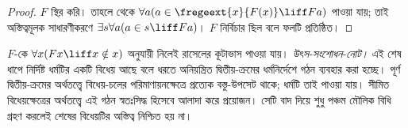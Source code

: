 \documentclass[../../../include/open-logic-section]{subfiles}
\begin{document}
\begin{proof}
$F$ স্থির করি। তাহলে  থেকে
$\forall a (a \in \fregeext{x}{F(x)} \liff Fa)$ পাওয়া যায়;
তাই অস্তিত্বমূলক সাধারণীকরণে
$\exists s\forall a(a \in s \liff Fa)$। $F$ নির্বিচার
ছিল বলে ফলটি প্রতিষ্ঠিত।
\end{proof}

$F$-কে $\forall x(Fx \liff x \notin x)$ অনুযায়ী নিলেই
রাসেলের কূটাভাস পাওয়া যায়।
\emph{উৎস-সংশোধন-নোট।} এই শেষ ধাপে নির্দিষ্ট ধর্মটির একটি
বিধেয় আছে বলে ধরতে অনিয়ন্ত্রিত দ্বিতীয়-ক্রমের ধর্মনির্দেশে
গঠন ব্যবহার করা হচ্ছে। পূর্ণ দ্বিতীয়-ক্রমের অর্থতত্ত্বে
বিধেয়-চলের পরিমাণায়নক্ষেত্রে প্রত্যেক বস্তু-উপসেট থাকে; ধর্মটি তাই
পাওয়া যায়। সীমিত বিধেয়ক্ষেত্রের অর্থতত্ত্বে এই গঠন স্বতঃসিদ্ধ
হিসেবে আলাদা করে প্রয়োজন। সেটি বাদ দিয়ে শুধু পঞ্চম মৌলিক
বিধি গ্রহণ করলেই শেষের বিধেয়টির অস্তিত্ব নিশ্চিত হয় না।
\end{document}
